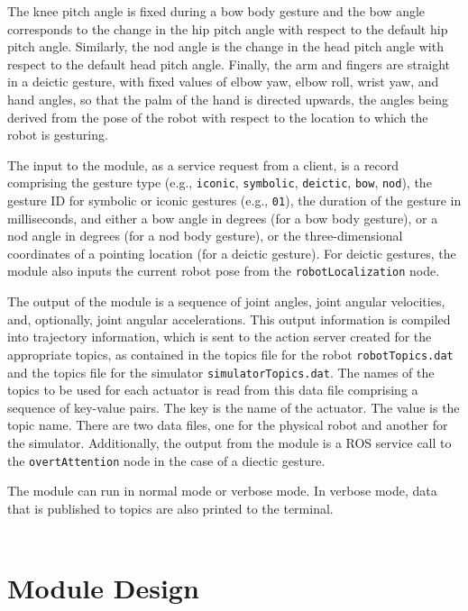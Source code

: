 \documentclass{CSSRforAfrica}
\begin{document}
The knee pitch angle is fixed during a bow body gesture and the bow angle corresponds to the change in the hip pitch angle with respect to the default hip pitch angle. Similarly, the nod angle is the change in the head pitch angle with respect to the default head pitch angle. Finally,  the arm and fingers are straight in a deictic gesture, with fixed values of elbow yaw, elbow roll, wrist yaw, and hand angles, so that the palm of the hand is directed upwards, the angles being derived from the pose of the robot with respect to the location to which the robot is gesturing.

The input to the module, as a service request from a client,  is a record comprising the gesture type (e.g., \texttt{iconic}, \texttt{symbolic}, \texttt{deictic}, \texttt{bow}, \texttt{nod}), the gesture ID for symbolic or iconic gestures (e.g., \texttt{01}), the duration of the gesture in milliseconds, and either a bow angle in degrees (for a bow body gesture), or a nod angle in degrees (for a nod body gesture), or the three-dimensional coordinates of a pointing location (for a deictic gesture). For deictic gestures, the module also inputs the current robot pose from the \texttt{robotLocalization} node.

The output of the module is a sequence of joint angles, joint angular velocities, and, optionally, joint angular
accelerations. This output information is compiled into trajectory information, which is sent to the action server created for the appropriate topics, as contained in the topics file for the robot \texttt{robotTopics.dat} and the topics file for the simulator \texttt{simulatorTopics.dat}. The names of the topics to be used for each actuator is read from this data file comprising a sequence of key-value pairs. The key is the name of the actuator. The value is the topic name. There are two data files, one for the physical robot and another for the simulator.  Additionally, the output from the module is a ROS service call to the \texttt{overtAttention} node in the case of a diectic gesture.

The module can run in normal mode or verbose mode. In verbose mode, data that is published to
topics are also printed to the terminal.
 \\~\\

\newpage
\section{Module Design}
\end{document}
